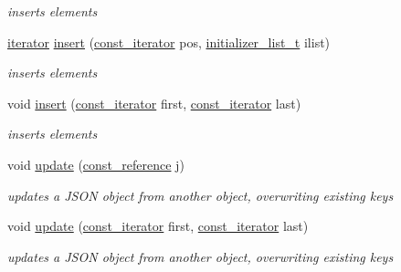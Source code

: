 \begin{DoxyCompactItemize}
\begin{DoxyCompactList}\small\item\em inserts elements \end{DoxyCompactList}\item 
\hyperlink{classnlohmann_1_1basic__json_a099316232c76c034030a38faa6e34dca}{iterator} \hyperlink{classnlohmann_1_1basic__json_aa19b9b9ca6967295b102f1cc487b1ad7}{insert} (\hyperlink{classnlohmann_1_1basic__json_a41a70cf9993951836d129bb1c2b3126a}{const\+\_\+iterator} pos, \hyperlink{classnlohmann_1_1basic__json_a670f6a0eb3d1e0ffd00c27d35472ccc9}{initializer\+\_\+list\+\_\+t} ilist)
\begin{DoxyCompactList}\small\item\em inserts elements \end{DoxyCompactList}\item 
void \hyperlink{classnlohmann_1_1basic__json_a1b0a4e60d56f1fe80501ed941e122892}{insert} (\hyperlink{classnlohmann_1_1basic__json_a41a70cf9993951836d129bb1c2b3126a}{const\+\_\+iterator} first, \hyperlink{classnlohmann_1_1basic__json_a41a70cf9993951836d129bb1c2b3126a}{const\+\_\+iterator} last)
\begin{DoxyCompactList}\small\item\em inserts elements \end{DoxyCompactList}\item 
void \hyperlink{classnlohmann_1_1basic__json_a1cfa9ae5e7c2434cab4cfe69bffffe11}{update} (\hyperlink{classnlohmann_1_1basic__json_a4057c5425f4faacfe39a8046871786ca}{const\+\_\+reference} j)
\begin{DoxyCompactList}\small\item\em updates a J\+S\+ON object from another object, overwriting existing keys \end{DoxyCompactList}\item 
void \hyperlink{classnlohmann_1_1basic__json_a27921dafadb3bbefd180235ec763e3ea}{update} (\hyperlink{classnlohmann_1_1basic__json_a41a70cf9993951836d129bb1c2b3126a}{const\+\_\+iterator} first, \hyperlink{classnlohmann_1_1basic__json_a41a70cf9993951836d129bb1c2b3126a}{const\+\_\+iterator} last)
\begin{DoxyCompactList}\small\item\em updates a J\+S\+ON object from another object, overwriting existing keys \end{DoxyCompactList}\item 

\end{DoxyCompactItemize}
